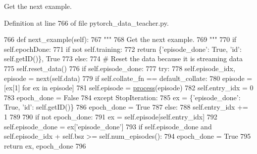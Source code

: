 \begin{DoxyVerb}Get the next example.
\end{DoxyVerb}
 

Definition at line 766 of file pytorch\+\_\+data\+\_\+teacher.\+py.


\begin{DoxyCode}
766     \textcolor{keyword}{def }next\_example(self):
767         \textcolor{stringliteral}{"""}
768 \textcolor{stringliteral}{        Get the next example.}
769 \textcolor{stringliteral}{        """}
770         \textcolor{keywordflow}{if} self.epochDone:
771             \textcolor{keywordflow}{if} \textcolor{keywordflow}{not} self.training:
772                 \textcolor{keywordflow}{return} \{\textcolor{stringliteral}{'episode\_done'}: \textcolor{keyword}{True}, \textcolor{stringliteral}{'id'}: self.getID()\}, \textcolor{keyword}{True}
773             \textcolor{keywordflow}{else}:
774                 \textcolor{comment}{# Reset the data because it is streaming data}
775                 self.reset\_data()
776         \textcolor{keywordflow}{if} self.episode\_done:
777             \textcolor{keywordflow}{try}:
778                 self.episode\_idx, episode = next(self.data)
779                 \textcolor{keywordflow}{if} self.collate\_fn == default\_collate:
780                     episode = [ex[1] \textcolor{keywordflow}{for} ex \textcolor{keywordflow}{in} episode]
781                 self.episode = \hyperlink{namespaceparlai_1_1core_1_1pytorch__data__teacher_a7b71207eb86027bc93809c1e4d57f641}{process}(episode)
782                 self.entry\_idx = 0
783                 epoch\_done = \textcolor{keyword}{False}
784             \textcolor{keywordflow}{except} StopIteration:
785                 ex = \{\textcolor{stringliteral}{'episode\_done'}: \textcolor{keyword}{True}, \textcolor{stringliteral}{'id'}: self.getID()\}
786                 epoch\_done = \textcolor{keyword}{True}
787         \textcolor{keywordflow}{else}:
788             self.entry\_idx += 1
789 
790         \textcolor{keywordflow}{if} \textcolor{keywordflow}{not} epoch\_done:
791             ex = self.episode[self.entry\_idx]
792             self.episode\_done = ex[\textcolor{stringliteral}{'episode\_done'}]
793             \textcolor{keywordflow}{if} self.episode\_done \textcolor{keywordflow}{and} self.episode\_idx + self.bsz >= self.num\_episodes():
794                 epoch\_done = \textcolor{keyword}{True}
795         \textcolor{keywordflow}{return} ex, epoch\_done
796 
\end{DoxyCode}
\mbox{\label{classparlai_1_1core_1_1pytorch__data__teacher_1_1PytorchDataTeacher_a68a9aac96f1eebc4f40e32f0ebfb5403}} 
